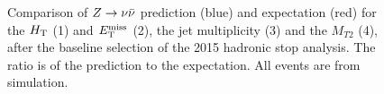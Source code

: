 \begin{figure}[tb!]
{}
\caption{Comparison of $Z\rightarrow \nu\bar{\nu}$ prediction (blue) and expectation (red) for the $H_{\rm T}$ (1) and $E_{\text{T}}^{\rm miss}$ (2), the jet multiplicity (3) and the $M_{T2}$ (4), after the baseline selection of the 2015 hadronic stop analysis. The ratio is of the prediction to the expectation. All events are from simulation.}
\label{fig:ZInvBaseline_MetHtNjMt2}
\end{figure}

